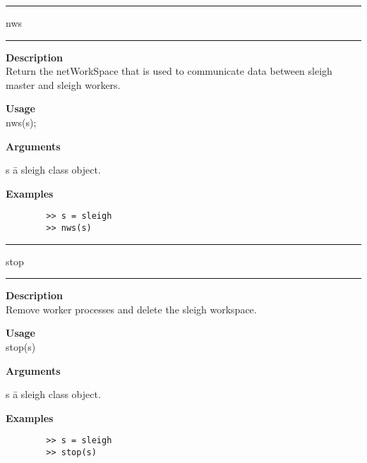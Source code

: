 \rule[0.06in]{6in}{0.01in}
\newline
nws
\newline
\rule{6in}{0.01in}
\begin{list}{}{}
	\item {\bf Description}\\
	Return the netWorkSpace that is used to communicate data between sleigh master and sleigh workers. 
	\item {\bf Usage}\\
	nws(s);
	\item {\bf Arguments}
		\begin{tabbing}
		s \hspace{2.5cm} \= a sleigh class object.
		\end{tabbing}
	\item {\bf Examples}
		\begin{verbatim}
		>> s = sleigh
		>> nws(s)
		\end{verbatim}
\end{list}

\rule[0.06in]{6in}{0.01in}
\par
stop
\newline
\rule{6in}{0.01in}
\begin{list}{}{}
	\item {\bf Description}\\
	Remove worker processes and delete the sleigh workspace.
	\item {\bf Usage}\\
	stop(s)
	\item {\bf Arguments}
		\begin{tabbing}
		s \hspace{2.5cm} \= a sleigh class object.\\
		\end{tabbing}
	\item {\bf Examples}
		\begin{verbatim}
		>> s = sleigh
		>> stop(s)
		\end{verbatim}
\end{list}

